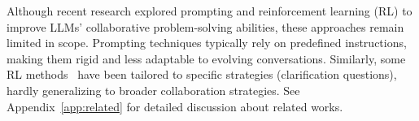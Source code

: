 

Although recent research explored prompting and reinforcement learning (RL) to improve LLMs' collaborative problem-solving abilities, these approaches remain limited in scope. Prompting techniques \citep{ask_more_informative_questions, clarify_when_necessary, clarifygpt, rephrase_and_respond} typically rely on predefined instructions, making them rigid and less adaptable to evolving conversations. 
Similarly, some RL methods~\citep{baize, clarify_question_for_retrieval, learn_to_clarify, star_gate, self_correct} have been tailored to specific strategies (\eg clarification questions), hardly generalizing to broader collaboration strategies. 
See Appendix~\ref{app:related} for detailed discussion about related works.


